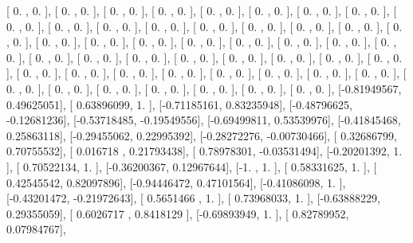 \documentclass{article}
\begin{document}
       [ 0.        ,  0.        ],
       [ 0.        ,  0.        ],
       [ 0.        ,  0.        ],
       [ 0.        ,  0.        ],
       [ 0.        ,  0.        ],
       [ 0.        ,  0.        ],
       [ 0.        ,  0.        ],
       [ 0.        ,  0.        ],
       [ 0.        ,  0.        ],
       [ 0.        ,  0.        ],
       [ 0.        ,  0.        ],
       [ 0.        ,  0.        ],
       [ 0.        ,  0.        ],
       [ 0.        ,  0.        ],
       [ 0.        ,  0.        ],
       [ 0.        ,  0.        ],
       [ 0.        ,  0.        ],
       [ 0.        ,  0.        ],
       [ 0.        ,  0.        ],
       [ 0.        ,  0.        ],
       [ 0.        ,  0.        ],
       [ 0.        ,  0.        ],
       [ 0.        ,  0.        ],
       [ 0.        ,  0.        ],
       [ 0.        ,  0.        ],
       [ 0.        ,  0.        ],
       [ 0.        ,  0.        ],
       [ 0.        ,  0.        ],
       [ 0.        ,  0.        ],
       [ 0.        ,  0.        ],
       [ 0.        ,  0.        ],
       [ 0.        ,  0.        ],
       [ 0.        ,  0.        ],
       [ 0.        ,  0.        ],
       [ 0.        ,  0.        ],
       [ 0.        ,  0.        ],
       [ 0.        ,  0.        ],
       [ 0.        ,  0.        ],
       [ 0.        ,  0.        ],
       [ 0.        ,  0.        ],
       [ 0.        ,  0.        ],
       [ 0.        ,  0.        ],
       [ 0.        ,  0.        ],
       [ 0.        ,  0.        ],
       [ 0.        ,  0.        ],
       [ 0.        ,  0.        ],
       [ 0.        ,  0.        ],
       [ 0.        ,  0.        ],
       [-0.81949567,  0.49625051],
       [ 0.63896099,  1.        ],
       [-0.71185161,  0.83235948],
       [-0.48796625, -0.12681236],
       [-0.53718485, -0.19549556],
       [-0.69499811,  0.53539976],
       [-0.41845468,  0.25863118],
       [-0.29455062,  0.22995392],
       [-0.28272276, -0.00730466],
       [ 0.32686799,  0.70755532],
       [ 0.016718  ,  0.21793438],
       [ 0.78978301, -0.03531494],
       [-0.20201392,  1.        ],
       [ 0.70522134,  1.        ],
       [-0.36200367,  0.12967644],
       [-1.        ,  1.        ],
       [ 0.58331625,  1.        ],
       [ 0.42545542,  0.82097896],
       [-0.94446472,  0.47101564],
       [-0.41086098,  1.        ],
       [-0.43201472, -0.21972643],
       [ 0.5651466 ,  1.        ],
       [ 0.73968033,  1.        ],
       [-0.63888229,  0.29355059],
       [ 0.6026717 ,  0.8418129 ],
       [-0.69893949,  1.        ],
       [ 0.82789952,  0.07984767],
\end{document}
